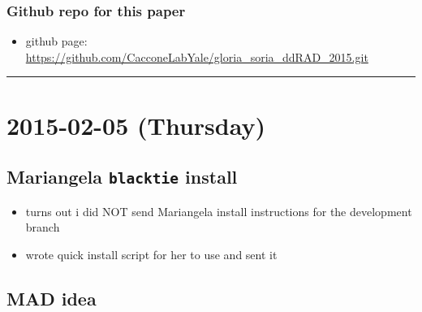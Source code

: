 \documentclass[letterpaper]{scrartcl}
\begin{document}
\subsubsection{Github repo for this
paper}\label{github-repo-for-this-paper}

\begin{itemize}
\itemsep1pt\parskip0pt
\item
  github
  page:\\\url{https://github.com/CacconeLabYale/gloria_soria_ddRAD_2015.git}
\end{itemize}

\begin{center}\rule{0.5\linewidth}{\linethickness}\end{center}

\section{2015-02-05 (Thursday)}\label{thursday}

\subsection{Mariangela \texttt{blacktie}
install}\label{mariangela-blacktie-install}

\begin{itemize}
\itemsep1pt\parskip0pt
\item
  turns out i did NOT send Mariangela install instructions for the
  development branch
\item
  wrote quick install script for her to use and sent it
\end{itemize}

\subsection{MAD idea}\label{mad-idea}
\end{document}
